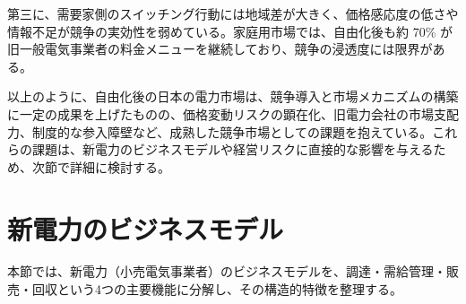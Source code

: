 第三に、需要家側のスイッチング行動には地域差が大きく、価格感応度の低さや情報不足が競争の実効性を弱めている。家庭用市場では、自由化後も約 70\% が旧一般電気事業者の料金メニューを継続しており、競争の浸透度には限界がある。

以上のように、自由化後の日本の電力市場は、競争導入と市場メカニズムの構築に一定の成果を上げたものの、価格変動リスクの顕在化、旧電力会社の市場支配力、制度的な参入障壁など、成熟した競争市場としての課題を抱えている。これらの課題は、新電力のビジネスモデルや経営リスクに直接的な影響を与えるため、次節で詳細に検討する。



\section{新電力のビジネスモデル}

本節では、新電力（小売電気事業者）のビジネスモデルを、調達・需給管理・販売・回収という4つの主要機能に分解し、その構造的特徴を整理する。

